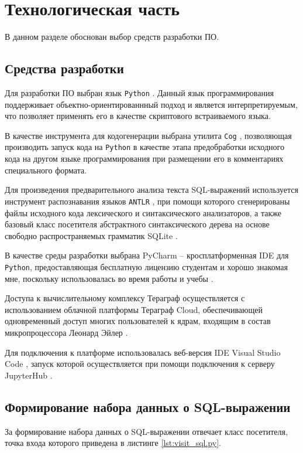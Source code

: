 \chapter{Технологическая часть}
В данном разделе обоснован выбор средств разработки ПО.

\section{Средства разработки}
Для разработки ПО выбран язык \texttt{Python} \cite{python}.
Данный язык программирования поддерживает объектно-ориентированнный подход и является интерпретируемым, что позволяет применять его в качестве скриптового встраиваемого языка.

В качестве инструмента для кодогенерации выбрана утилита \texttt{Cog} \cite{cog}, позволяющая производить запуск кода на \texttt{Python} в качестве этапа предобработки исходного кода на другом языке программирования при размещении его в комментариях специального формата.

Для произведения предварительного анализа текста SQL-выражений используется инструмент распознавания языков \texttt{ANTLR} \cite{antlr}, при помощи которого сгенерированы файлы исходного кода лексического и синтаксического анализаторов, а также базовый класс посетителя абстрактного синтаксического дерева на основе свободно распространяемых грамматик SQLite \cite{antlr_grammars}.

В качестве среды разработки выбрана PyCharm -- кросплатформенная IDE для \texttt{Python}, предоставляющая бесплатную лицензию студентам и хорошо знакомая мне, поскольку использовалась во время работы и учебы \cite{pycharm}.

Доступа к вычислительному комплексу Тераграф осуществляется с использованием облачной платформы Тераграф Cloud, обеспечивающей одновременный доступ многих пользователей к ядрам, входящим в состав микропроцессора Леонард Эйлер \cite{teragraph_cloud}.

Для подключения к платформе использовалась веб-версия IDE Visual Studio Code \cite{vscode}, запуск которой осуществляется при помощи подключения к серверу JupyterHub \cite{jupyter}.

\section{Формирование набора данных о SQL-выражении}
За формирование набора данных о SQL-выражении отвечает класс посетителя, точка входа которого приведена в листинге \ref{lst:visit_sql.py}.

